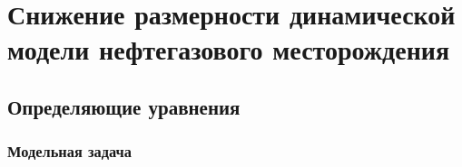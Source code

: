 \chapter{Снижение размерности динамической модели нефтегазового месторождения}\label{ch:ch2}



\newcommand{\bvec}[1]{\mathbf{#1}}
\newcommand{\resid}{\bvec{r}}
\newcommand{\unk}{\bvec{u}}
\newcommand{\jac}{\mathrm{J}}
\newcommand{\dunk}{\Delta \unk}
\newcommand{\vunk}{\bvec{v}}
\newcommand{\matr}[1]{\mathrm{\uppercase{#1}}}
\newcommand{\norm}[2][~]{\left\| #2  \right\|_{#1}}
\newcommand{\transpose}[1]{\matr{#1}^\mathrm{T}}
\newcommand{\dvunk}{\Delta \vunk}
\newcommand{\deriv}[3][]{\frac{\partial^{#1} #2}{\partial #3^{#1}}}
\newcommand{\pc}[1][~]{\bvec{\varphi}_{#1}}
\newcommand{\param}{\bvec{\mu}}
\newcommand{\nlin}{\bvec{\eta}}


\section{Определяющие уравнения}

\subsection{Модельная задача}

\begin{figure}[ht]
    \caption{}\label{fig:FOM}
\end{figure}

